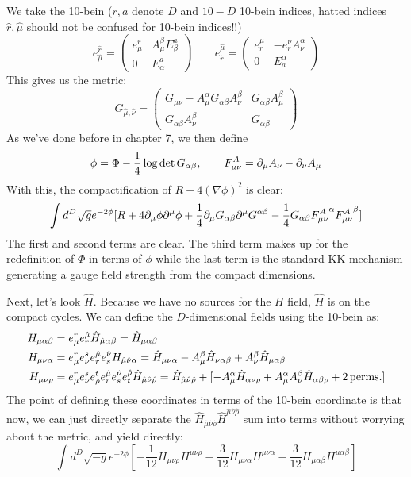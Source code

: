 \documentclass[11pt, class=article, crop=false]{standalone}
\begin{document}
\begin{enumerate}
	We take the 10-bein ($r, a$ denote $D$ and $10-D$ 10-bein indices, hatted indices $\hat r, \hat \mu$ should not be confused for 10-bein indices!!)
	\[
		e_{\hat \mu}^{\hat r} = \begin{pmatrix}
			e^r_\mu & A^\beta_\mu E^a_\beta\\
			0 & E^a_\alpha
		\end{pmatrix}\qquad
		e_{\hat r}^{\hat \mu} = \begin{pmatrix}
			e_r^\mu & -e_r^\nu A^\alpha_\nu\\
			0 & E_a^\alpha
		\end{pmatrix}
	\]
	This gives us the metric:
	\[
		G_{\hat \mu, \hat \nu} = \begin{pmatrix}
			G_{\mu \nu} - A_\mu^\alpha G_{\alpha \beta} A_\nu^\beta &  G_{\alpha \beta} A_\mu^\beta\\
			G_{\alpha \beta} A_\nu^\beta & G_{\alpha \beta}
		\end{pmatrix}
	\]
	As we've done before in chapter 7, we then define 
	\[
		\phi = \Phi - \frac14 \log \det G_{\alpha \beta}, \qquad F^A_{\mu \nu} = \partial_\mu A_\nu - \partial_\nu A_\mu
	\]
	With this, the compactification of $R + 4 (\nabla \phi)^2$ is clear:
	\[
		\int d^D \sqrt{g} e^{-2\phi} [R + 4 \partial_\mu \phi \partial^\mu \phi + \frac14 \partial_\mu G_{\alpha \beta} \partial^\mu G^{\alpha \beta} - \frac14 G_{\alpha \beta} {F^A_{\mu \nu}}^\alpha {F^A_{\mu \nu}}^\beta]
	\]
	The first and second terms are clear. The third term makes up for the redefinition of $\Phi$ in terms of $\phi$ while the last term is the standard KK mechanism generating a gauge field strength from the compact dimensions. 
	
	Next, let's look $\hat H$. Because we have no sources for the $H$ field, $\hat H$ is on the compact cycles. We can define the $D$-dimensional fields using the 10-bein as:
	\begin{align}
		H_{\mu \alpha \beta} &= e^r_\mu e_r^{\hat \mu} \hat H_{\hat \mu \alpha \beta} = \hat H_{\mu \alpha \beta} \label{eq:H1}\\
		H_{\mu \nu \alpha} &= e^r_\mu e^s_\nu e_r^{\hat \mu} e_s^{\hat \nu} H_{\hat \mu \hat \nu \alpha} = \hat H_{\mu \nu \alpha} - A_\mu^\beta \hat H_{\nu \alpha \beta} + A_\nu^\beta \hat H_{\mu \alpha \beta} \label{eq:H2}\\
		H_{\mu \nu \rho} &= e^r_\mu e^s_\nu  e^t_\rho e_r^{\hat \mu} e_s^{\hat \nu} e_t^{\hat \rho} \hat H_{\hat \mu \hat \nu \hat \rho} = 
		\hat H_{\hat \mu \hat \nu \hat \rho} + [- A_\mu^\alpha \hat H_{\alpha \nu \rho} + A_{\mu}^\alpha A_\nu^\beta \hat H_{\alpha \beta \rho} + 2 \,\mathrm{perms.}] \label{eq:H3}
	\end{align}
	The point of defining these coordinates in terms of the 10-bein coordinate is that now, we can just directly separate the $\hat H_{\hat \mu \hat \nu \hat \rho} \hat H^{\hat \mu \hat \nu \hat \rho}$ sum into terms without worrying about the metric, and yield directly:
	\[
		\int d^D \sqrt{-g} e^{- 2 \phi} [-\frac{1}{12} H_{\mu \nu \rho} H^{\mu \nu \rho} - \frac{3}{12} H_{\mu \nu \alpha} H^{\mu \nu \alpha} - \frac{3}{12} H_{\mu \alpha \beta} H^{\mu \alpha \beta} ]
	\]
	

\end{enumerate}
\end{document}
